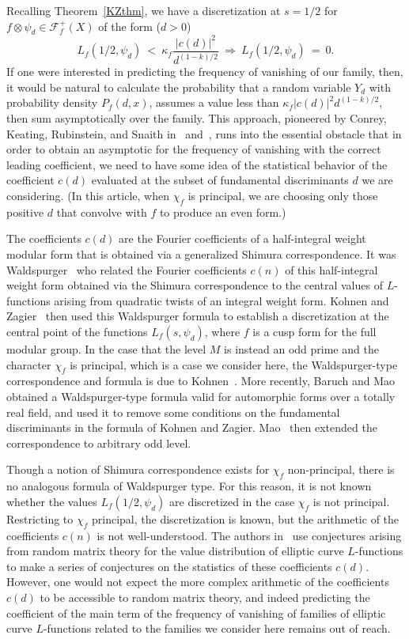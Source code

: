 \documentclass[11pt,reqno]{amsart} \usepackage{fullpage}
\newcommand{\F}{\ensuremath{\mathbf{F}}}
\newcommand\be{\begin{equation}}
\newcommand\ee{\end{equation}}
\renewcommand{\F}{\mathcal F_f}
\numberwithin{equation}{section}
\begin{document}
Recalling Theorem~\ref{KZthm}, we have a discretization at $s=1/2$ for
$f\otimes\psi_d\in\F^+(X)$ of the form ($d>0$) \be L_f(1/2,\psi_d)
\ <\ \kappa_f\frac{|c(d)|^2}{d^{(1-k)/2}}\ \Rightarrow\ L_{f}(1/2,\psi_d)\ =\ 0.\ee
If one were interested in predicting the frequency of vanishing of our family, then, 
it would be natural to calculate the probability that a random variable $Y_d$ with
probability density $P_f(d,x)$, assumes a value less than $\kappa_f|c(d)|^2 d^{(1-k)/2}$,
then sum asymptotically over the family.
This approach, pioneered by Conrey, Keating, Rubinstein, and Snaith in~\cite{CKRS1}
and~\cite{CKRS2}, runs into the essential obstacle that in order to obtain an asymptotic
for the frequency of vanishing with the correct leading coefficient, we need to have some
idea of the statistical behavior of the coefficient $c(d)$ evaluated at the subset of
fundamental discriminants $d$ we are considering. (In this article, when $\chi_f$ is
principal, we are choosing only those positive $d$ that convolve with $f$ to produce an
even form.)

The coefficients $c(d)$ are the Fourier coefficients of a half-integral weight
modular form that is obtained via a generalized Shimura correspondence.
It was Waldspurger~\cite{wald1,wald2} who related the Fourier coefficients $c(n)$ of
this half-integral weight form obtained via the Shimura correspondence to the central
values of $L$-functions arising from quadratic twists of an integral weight form.
Kohnen and Zagier~\cite{KZ} then used this Waldspurger formula to establish a
discretization at the central point of the functions $L_f(s,\psi_d)$, where $f$ is a cusp
form for the full modular group.
In the case that the level $M$ is instead an odd prime and the character $\chi_f$ is
principal, which is a case we consider here, the Waldspurger-type correspondence and
formula is due to Kohnen~\cite{kohnen}. More recently, Baruch and Mao~\cite{BM} obtained a
Waldspurger-type formula valid for automorphic forms over a totally real field, and used it
to remove some conditions on the fundamental discriminants in the formula of Kohnen and
Zagier. Mao~\cite{mao} then extended the correspondence to arbitrary odd level.

Though a notion of Shimura correspondence exists for $\chi_f$ non-principal, there is no
analogous formula of Waldspurger type. For this reason, it is not known whether the values
$L_f(1/2,\psi_d)$ are discretized in the case $\chi_f$ is not principal. Restricting to
$\chi_f$ principal, the discretization is known, but the arithmetic of the coefficients
$c(n)$ is not well-understood. The authors in~\cite[\S4]{CKRS2} use conjectures arising
from random matrix theory for the value distribution of elliptic curve $L$-functions to
make a series of conjectures on the statistics of these coefficients $c(d)$. However, one
would not expect the more complex arithmetic of the coefficients $c(d)$ to be accessible to
random matrix theory, and indeed predicting the coefficient of the main term of the
frequency of vanishing of families of elliptic curve $L$-functions related to the families
we consider here remains out of reach.
\end{document}
